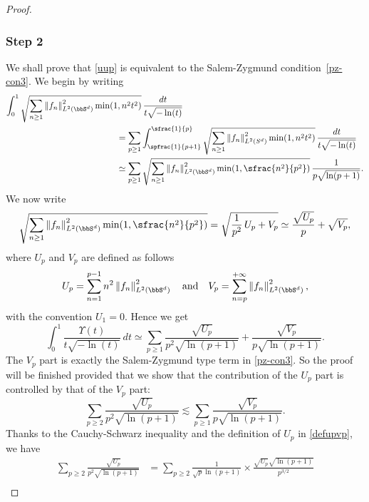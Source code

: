 \begin{proof}
\subsubsection*{Step 2} We shall prove that \eqref{uup} is equivalent to the Salem-Zygmund condition~\eqref{pz-con3}. We begin by writing
\begin{align*}
\int_{0}^1 \sqrt{\sum_{n\geq 1} \left\Vert f_n\right\Vert_{L^2(\bbS^d)}^2 \min(1,n^2 t^2)}&\,\frac{dt}{t\sqrt{-\ln(t)}} \\
&\hspace*{-1cm}=
\sum_{p\geq 1} \int_{\spfrac{1}{p+1}}^{\sfrac{1}{p}}\sqrt{\sum_{n\geq 1} \left\Vert f_n\right\Vert_{L^2(S^d)}^2 \min(1,n^2 t^2)}\,\frac{dt}{t\sqrt{-\ln(t)}} \\
&\hspace*{-1cm}\simeq
\sum_{p\geq 1} \sqrt{\sum_{n\geq 1} \left\Vert f_n\right\Vert_{L^2(\bbS^d)}^2 \min(1,\sfrac{n^2}{p^2})} \,\frac{1}{p\sqrt{\ln(p+1)}}.
\end{align*}
We now write
\begin{equation*}
\sqrt{\sum_{n\geq 1} \left\Vert f_n\right\Vert_{L^2(\bbS^d)}^2 \min(1,\sfrac{n^2}{p^2})}=\sqrt{\frac{1}{p^2}\,U_p+V_p}\simeq \frac{\sqrt{U_p}}{p}+\sqrt{V_p},
\end{equation*}
where $U_p$ and $V_p$ are defined as follows
\begin{equation}\label{defupvp}
U_p=\sum_{n=1}^{p-1} n^2 \left\Vert f_n\right\Vert_{L^2(\bbS^d)}^2 \quad \text{and}\quad V_p=\sum_{n=p}^{+\infty} \left\Vert f_n\right\Vert_{L^2(\bbS^d)}^2, \end{equation}
with the convention $U_1=0$. Hence we get
\begin{equation*}
\int_{0}^1 \frac{\Upsilon(t)}{t\sqrt{-\ln(t)}}\,dt
\simeq \sum_{p\geq 1} \frac{\sqrt{U_p}}{p^2\sqrt{\ln(p+1)}}+\frac{\sqrt{V_p}}{p \sqrt{\ln(p+1)}} .
\end{equation*}
The $V_p$ part is exactly the Salem-Zygmund type term in \eqref{pz-con3}. So the proof will be finished provided that we show that the contribution of the $U_p$ part is controlled by that of the $V_p$ part:
\begin{equation}\label{ddom}
\sum_{p\geq 2} \frac{\sqrt{U_p}}{p^2\sqrt{\ln(p+1)}}\lesssim \sum_{p\geq 1} \frac{\sqrt{V_p}}{p\sqrt{\ln(p+1)}}.
\end{equation}
Thanks to the Cauchy-Schwarz inequality and the definition of $U_p$ in \eqref{defupvp}, we have
\begin{align*}
\sum_{p\geq 2} \frac{\sqrt{U_p}}{p^2\sqrt{\ln(p+1)}} & = \sum_{p\geq 2} \frac{1}{\sqrt{p}\ln(p+1)}\times \frac{\sqrt{U_p} \sqrt{\ln(p+1)}}{p^{3/2}} \\

\end{align*}
\end{proof}
